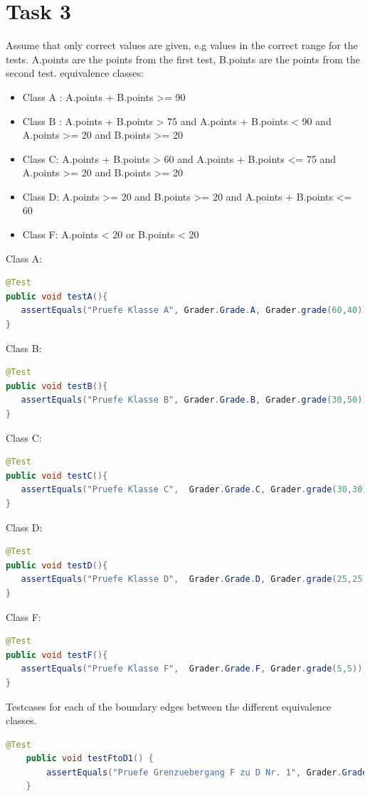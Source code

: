 \chapter{Task 3}
\begin{parlist}
\item Assume that only correct values are given, e.g values in the correct range for the tests. A.points are the points from the first test, B.points are the points from the second test.
equivalence classes:
\begin{itemize}
\item Class A :  A.points + B.points >= 90 
\item Class B :  A.points + B.points > 75  and  A.points + B.points < 90 and A.points >= 20 and B.points >= 20
\item Class C:  A.points + B.points > 60  and  A.points + B.points <= 75 and A.points >= 20 and B.points >= 20
\item Class D:  A.points >= 20 and B.points >= 20  and  A.points + B.points <= 60
\item Class F:  A.points < 20 or B.points < 20
\end{itemize}
\item 
Class A:
\begin{lstlisting}[language=java,frame=trBL]
@Test
public void testA(){
   assertEquals("Pruefe Klasse A", Grader.Grade.A, Grader.grade(60,40));
}
\end{lstlisting}
Class B:
\begin{lstlisting}[language=java,frame=trBL]
@Test
public void testB(){
   assertEquals("Pruefe Klasse B", Grader.Grade.B, Grader.grade(30,50));
}
\end{lstlisting}
Class C:
\begin{lstlisting}[language=java,frame=trBL]
@Test
public void testC(){
   assertEquals("Pruefe Klasse C",  Grader.Grade.C, Grader.grade(30,30));
}
\end{lstlisting}
Class D:
\begin{lstlisting}[language=java,frame=trBL]
@Test
public void testD(){
   assertEquals("Pruefe Klasse D",  Grader.Grade.D, Grader.grade(25,25));
}
\end{lstlisting}
Class F:
\begin{lstlisting}[language=java,frame=trBL]
@Test
public void testF(){
   assertEquals("Pruefe Klasse F",  Grader.Grade.F, Grader.grade(5,5));
}
\end{lstlisting}

\item Testcases for each of the boundary edges between the different equivalence classes.
\begin{lstlisting}[language=java,frame=trBL]
	@Test
	public void testFtoD1() {
		assertEquals("Pruefe Grenzuebergang F zu D Nr. 1", Grader.Grade.F, Grader.grade(30, 19));
	}


\end{lstlisting}
\end{parlist}
